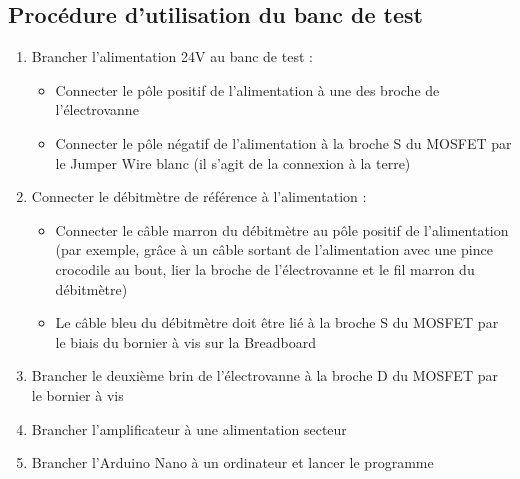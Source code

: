 \subsection{Procédure d'utilisation du banc de test}
\begin{enumerate}
    \item Brancher l'alimentation 24V au banc de test :
          \begin{itemize}
              \item Connecter le pôle positif de l'alimentation à une des broche de l'électrovanne
              \item Connecter le pôle négatif de l'alimentation à la broche S du MOSFET par le Jumper Wire blanc (il s'agit de la connexion à la terre)
          \end{itemize}

    \item Connecter le débitmètre de référence à l'alimentation :
          \begin{itemize}
              \item Connecter le câble marron du débitmètre au pôle positif de l'alimentation (par exemple, grâce à un câble sortant de l'alimentation
                    avec une pince crocodile au bout, lier la broche de l'électrovanne et le fil marron du débitmètre)
              \item Le câble bleu du débitmètre doit être lié à la broche S du MOSFET par le biais du bornier à vis sur la Breadboard
          \end{itemize}


    \item Brancher le deuxième brin de l'électrovanne à la broche D du MOSFET par le bornier à vis\\

    \item Brancher l'amplificateur à une alimentation secteur\\

    \item Brancher l'Arduino Nano à un ordinateur et lancer le programme\\


\end{enumerate}
